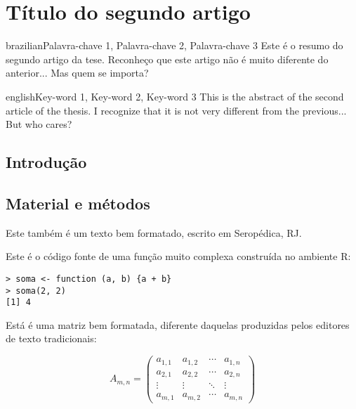 \artigotrue
\chapter{Título do segundo artigo}
\label{chap:chapter01}

\begin{chapterabstract}{brazilian}{Palavra-chave 1, Palavra-chave 2, Palavra-chave 3}
Este é o resumo do segundo artigo da tese. Reconheço que este artigo não é muito
diferente do anterior... Mas quem se importa?
\end{chapterabstract}

\begin{chapterabstract}{english}{Key-word 1, Key-word 2, Key-word 3}
This is the abstract of the second article of the thesis. I recognize that it is
not very different from the previous... But who cares?
\end{chapterabstract}

\formatchapter

\section{Introdução}

\blindtext[2]

\section{Material e métodos}

Este também é um texto bem formatado, escrito em Seropédica, RJ. \blindtext[1]

Este é o código fonte de uma função muito complexa construída no ambiente R:

\begin{verbatim}
> soma <- function (a, b) {a + b}
> soma(2, 2)
[1] 4
\end{verbatim}

Está é uma matriz bem formatada, diferente daquelas produzidas pelos editores de
texto tradicionais:

\begin{equation}
  A_{m,n} =
 \begin{pmatrix}
  a_{1,1} & a_{1,2} & \cdots & a_{1,n} \\
  a_{2,1} & a_{2,2} & \cdots & a_{2,n} \\
  \vdots  & \vdots  & \ddots & \vdots  \\
  a_{m,1} & a_{m,2} & \cdots & a_{m,n}
 \end{pmatrix}
\end{equation}

